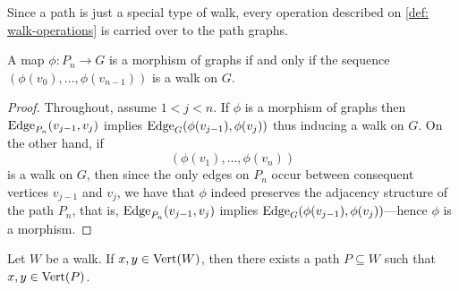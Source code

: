 Since a path is just a special type of walk, every operation described on
\cref{def: walk-operations} is carried over to the path graphs.

\begin{proposition}
    \label{prop: morphism-path-walk}
    A map \(\phi: P_n \to G\) is a morphism of graphs if and only if the sequence
    \((\phi(v_0), \dots, \phi(v_{n-1}))\) is a walk on \(G\).
\end{proposition}

\begin{proof}
    Throughout, assume \(1 < j < n\). If \(\phi\) is a morphism of graphs then
    \(\operatorname{Edge}_{P_n}(v_{j-1}, v_{j})\) implies \(\operatorname{Edge}_G(\phi(v_{j-1}), \phi(v_{j}))\) thus
    inducing a walk on \(G\). On the other hand, if
    \[
        (\phi(v_1), \dots, \phi(v_{n}))
    \]
    is a walk on \(G\), then since the only edges on \(P_n\) occur
    between consequent vertices \(v_{j-1}\) and \(v_{j}\), we have that \(\phi\)
    indeed preserves the adjacency structure of the path \(P_n\), that is,
    \(\operatorname{Edge}_{P_n}(v_{j-1}, v_{j})\) implies \(\operatorname{Edge}_G(\phi(v_{j-1}), \phi(v_{j}))\)---hence
    \(\phi\) is a morphism.
\end{proof}

\begin{lemma}\label{lem: paths-on-walks}
    Let \(W\) be a walk. If \(x, y \in \operatorname{Vert}(W)\), then there exists a path \(P
    \subseteq W\) such that \(x, y \in \operatorname{Vert}(P)\).
\end{lemma}

